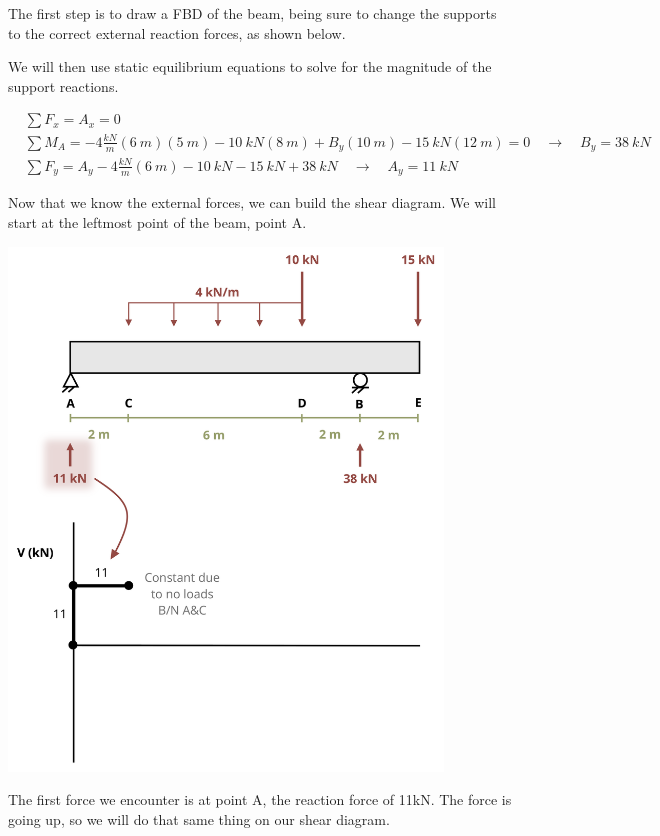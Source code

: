 \documentclass[
  letterpaper,
  DIV=11,
  numbers=noendperiod]{scrreprt}
\begin{document}
\begin{tcolorbox}
\begin{tcolorbox}
The first step is to draw a FBD of the beam, being sure to change the
supports to the correct external reaction forces, as shown below.

We will then use static equilibrium equations to solve for the magnitude
of the support reactions.

\[
\begin{aligned}
&\sum F_x=A_x=0 \\
&\sum M_A=-4\frac{kN}{m}(6{~m})(5{~m})-10{~kN}(8{~m})+B_y(10{~m})-15{~kN}(12{~m})=0 \quad\rightarrow\quad B_y =38{~kN} \\
&\sum F_y=A_y-4\frac{kN}{m}(6{~m})-10{~kN}-15{~kN}+38{~kN} \quad\rightarrow\quad A_y =11{~kN}
\end{aligned}
\]

Now that we know the external forces, we can build the shear diagram. We
will start at the leftmost point of the beam, point A.

\begin{center}
\includegraphics[width=4.54167in,height=\textheight]{images/CH7 PNGs/example 7.3 part 3.png}
\end{center}

The first force we encounter is at point A, the reaction force of 11kN.
The force is going up, so we will do that same thing on our shear
diagram.


\end{tcolorbox}
\end{tcolorbox}
\end{document}
